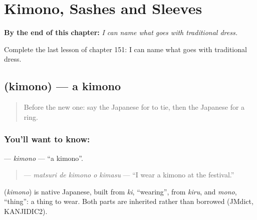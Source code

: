 
\chapter{Kimono, Sashes and Sleeves}
\label{ch:ja-kimono-sashes-and-sleeves}

\begin{chapteropening}
\textbf{By the end of this chapter:} \emph{I can name what goes with traditional dress.}

Complete the last lesson of chapter 151: I can name what goes with traditional dress.
\end{chapteropening}

\section[\texorpdfstring{\ja{きもの} (kimono)}{きもの (kimono)}]{ (kimono) — a kimono}

\label{lesson:JA-C151-kimono}



\begin{quote}
Before the new one: say the Japanese for to tie, then the Japanese for a ring.
\end{quote}

\subsection*{You'll want to know: }
\textbf{} — \emph{kimono} — \textquotedblleft{}a kimono\textquotedblright{}.

\begin{quote}
\textbf{  } — \emph{matsuri de kimono o kimasu} — \textquotedblleft{}I wear a kimono at the festival.\textquotedblright{}
\end{quote}

\begin{cousinweb}
\textbf{} (\emph{kimono}) is native Japanese, built from \emph{ki}, \textquotedblleft{}wearing\textquotedblright{}, from \emph{kiru}, and \emph{mono}, \textquotedblleft{}thing\textquotedblright{}: a thing to wear. Both parts are inherited rather than borrowed (JMdict, KANJIDIC2).
\end{cousinweb}


